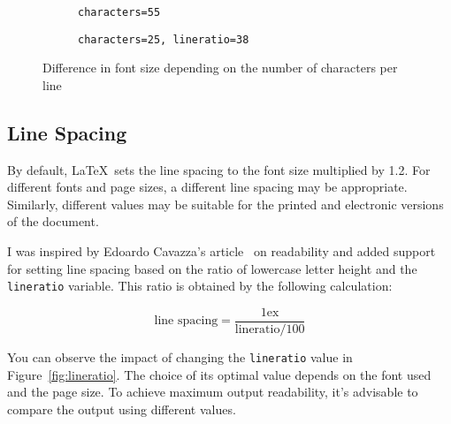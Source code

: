\documentclass{ltugboat}
\begin{document}
\begin{figure}[tbp]
  \begin{subfigure}[t]{0.45\textwidth}
\caption{\texttt{characters=55}}
\end{subfigure}
\hfill
\begin{subfigure}[t]{0.45\textwidth}
\caption{\texttt{characters=25, lineratio=38}}
\end{subfigure}
  \caption{Difference in font size depending on the number of characters per line}\label{fig:fontsize}
\end{figure}

\subsection{Line Spacing}

By default, \LaTeX\ sets the line spacing to the font size multiplied by 1.2. For different fonts and page sizes, a different line spacing may be appropriate. Similarly, different values may be suitable for the printed and electronic versions of the document.

I was inspired by Edoardo Cavazza's article~\cite{cavazza} on readability and added support for setting line spacing based on the ratio of lowercase letter height and the \texttt{lineratio} variable. This ratio is obtained by the following calculation:

\[ \text{line spacing} = \frac{1\text{ex}}{\text{lineratio}/100} \]

You can observe the impact of changing the \texttt{lineratio} value in Figure~\ref{fig:lineratio}. The choice of its optimal value depends on the font used and the page size. To achieve maximum output readability, it's advisable to compare the output using different values.
\end{document}
